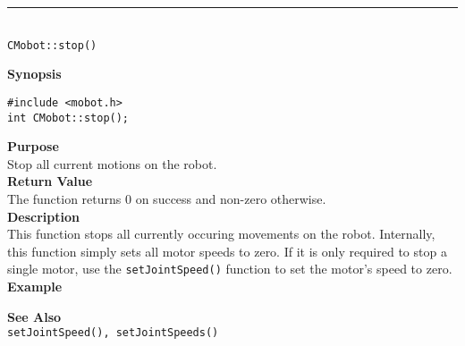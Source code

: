 \noindent
\vspace{5pt}
\rule{4.5in}{0.015in}\\
\noindent
{\LARGE \texttt{CMobot::stop()}}\\
{}

\noindent
{\bf Synopsis}
\vspace{-8pt}
\begin{verbatim}
#include <mobot.h>
int CMobot::stop();
\end{verbatim}

\noindent
{\bf Purpose}\\
Stop all current motions on the robot.\\

\noindent
{\bf Return Value}\\
The function returns 0 on success and non-zero otherwise.\\

\noindent
{\bf Description}\\
This function stops all currently occuring movements on the robot. Internally, this function simply sets all motor speeds to zero. If it is only required to stop a single motor, use the 
\texttt{setJointSpeed()} function to set the motor's speed to zero. \\

\noindent
{\bf Example}\\
\noindent

\noindent
{\bf See Also}\\
\texttt{setJointSpeed(), setJointSpeeds()}

